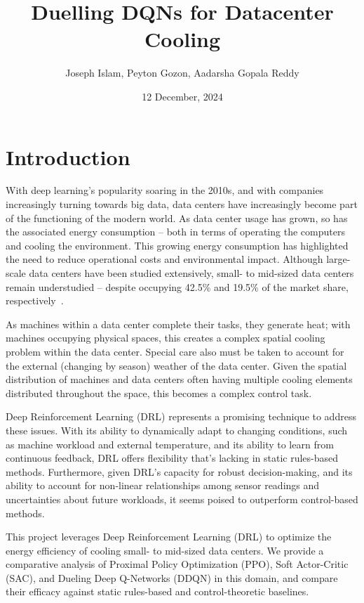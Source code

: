\documentclass[12pt]{article}
\title{Duelling DQNs for Datacenter Cooling}
\author{Joseph Islam, Peyton Gozon, Aadarsha Gopala Reddy}
\date{12 December, 2024}
\begin{document}
\maketitle

\section{Introduction}

With deep learning's popularity soaring in the 2010s, and with companies increasingly turning towards big data, data centers have increasingly become part of the functioning of the modern world. As data center usage has grown, so has the associated energy consumption -- both in terms of operating the computers and cooling the environment. This growing energy consumption has highlighted the need to reduce operational costs and environmental impact. Although large-scale data centers have been studied extensively, small- to mid-sized data centers remain understudied -- despite occupying 42.5\% and 19.5\% of the market share, respectively~\cite{brightlio_data_center_stats}. 

As machines within a data center complete their tasks, they generate heat; with machines occupying physical spaces, this creates a complex spatial cooling problem within the data center. Special care also must be taken to account for the external (changing by season) weather of the data center. Given the spatial distribution of machines and data centers often having multiple cooling elements distributed throughout the space, this becomes a complex control task.

Deep Reinforcement Learning (DRL) represents a promising technique to address these issues. With its ability to dynamically adapt to changing conditions, such as machine workload and external temperature, and its ability to learn from continuous feedback, DRL offers flexibility that's lacking in static rules-based methods. Furthermore, given DRL's capacity for robust decision-making, and its ability to account for non-linear relationships among sensor readings and uncertainties about future workloads, it seems poised to outperform control-based methods.

This project leverages Deep Reinforcement Learning (DRL) to optimize the energy efficiency of cooling  small- to mid-sized data centers. We provide a comparative analysis of Proximal Policy Optimization (PPO), Soft Actor-Critic (SAC), and Dueling Deep Q-Networks (DDQN) in this domain, and compare their efficacy against static rules-based and control-theoretic baselines. 
\end{document}
